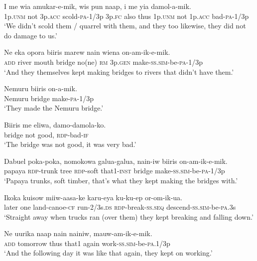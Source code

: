 \ea
\gll  I  me  wia  amukar-e-mik,  wis  pun  naap, i  me  yia  damol-a-mik. \\
1p.\textsc{unm}  not  3p.\textsc{acc}  scold-\textsc{pa}-1/3p  3p.\textsc{fc}  also  thus 1p.\textsc{unm}  not  1p.\textsc{acc}  bad-\textsc{pa}-1/3p \\ 
\glt ‘We didn’t scold them / quarrel with them, and they too likewise, they did not do damage to us.’ \\
\z


\ea
\gll  Ne  eka  opora  biiris  marew  nain  wiena  on-am-ik-e-mik. \\
\textsc{add}  river  mouth  bridge  no(ne)  \textsc{rm}  3p.\textsc{gen} make-\textsc{ss}.\textsc{sim}-be-\textsc{pa}-1/3p \\ 
\glt ‘And they themselves kept making bridges to rivers that didn’t have them.’ \\
\z


\ea
\gll  Nemuru  biiris  on-a-mik. \\
Nemuru  bridge  make-\textsc{pa}-1/3p \\
\glt ‘They made the Nemuru bridge.’ \\
\z


\ea
\gll  Biiris  me  eliwa,  damo-damola-ko. \\
bridge  not  good,  \textsc{rdp}-bad-\textsc{if} \\
\glt ‘The bridge was not good, it was very bad.’ \\
\z


\ea
\gll  Dabuel  poka-poka,  nomokowa  galua-galua,  nain-iw  biiris  on-am-ik-e-mik. \\
papaya  \textsc{rdp}-trunk  tree  \textsc{rdp}-soft that1-\textsc{inst}  bridge  make-\textsc{ss}.\textsc{sim}-be-\textsc{pa}-1/3p\\ 
\glt ‘Papaya trunks, soft timber, that’s what they kept making the bridges with.’ \\
\z


\ea
\gll  Ikoka  kuisow  miiw-aasa-ke  karu-eya  ku-ku-ep   or-om-ik-ua. \\
later  one  land-canoe-\textsc{cf}  run-2/3s.\textsc{ds}  \textsc{rdp}-break-\textsc{ss.seq} descend-\textsc{ss}.\textsc{sim}-be-\textsc{pa}.3s \\ 
\glt ‘Straight away when trucks ran (over them) they kept breaking and falling down.’ \\
\z


\ea
\gll  Ne  uurika  naap  nain  nainiw,  mauw-am-ik-e-mik. \\
\textsc{add}  tomorrow  thus  that1  again  work-\textsc{ss}.\textsc{sim}-be-\textsc{pa}.1/3p \\
\glt ‘And the following day it was like that again, they kept on working.’ \\
\z



